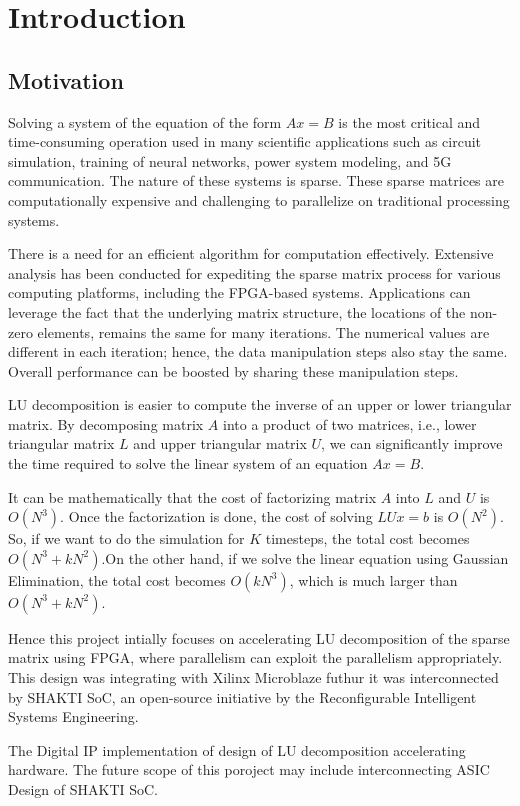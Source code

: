 \chapter{Introduction}
\section{Motivation}
Solving a system of the equation of the form $Ax=B$ is the most critical and time-consuming operation used in many scientific applications such as circuit simulation, training of neural networks, power system modeling, and 5G communication. The nature of these systems is sparse. These sparse matrices are computationally expensive and challenging to parallelize on traditional processing systems.

There is a need for an efficient algorithm for computation effectively.  Extensive analysis has been conducted for expediting the sparse matrix process for various computing platforms, including the FPGA-based systems. Applications can leverage the fact that the underlying matrix structure, the locations of the non-zero elements, remains the same for many iterations. The numerical values are different in each iteration; hence, the data manipulation steps also stay the same. Overall performance can be boosted by sharing these manipulation steps.

LU decomposition is easier to compute the inverse of an upper or lower triangular matrix. By decomposing matrix $A$ into a product of two matrices, i.e., lower triangular matrix $L$ and upper triangular matrix $U$, we can significantly improve the time required to solve the linear system of an equation $Ax = B$.

It can be mathematically that the cost of factorizing matrix $A$ into $L$ and $U$ is $O(N^3)$. Once the factorization is done, the cost of solving $LUx = b$ is $O(N^2)$. So, if we want to do the simulation for $K$ timesteps, the total cost becomes $O(N^3 + kN^2)$.On the other hand, if we solve the linear equation using Gaussian Elimination, the total cost becomes $O(kN^3)$, which is much larger than $O(N^3 + kN^2)$.

Hence this project intially focuses on accelerating LU decomposition of the sparse matrix using FPGA, where parallelism can exploit the parallelism appropriately. This design was integrating with Xilinx Microblaze futhur it was interconnected by SHAKTI SoC, an open-source initiative by the Reconfigurable Intelligent Systems Engineering.

The Digital IP implementation of design of LU decomposition accelerating hardware. The future scope of this poroject may include interconnecting ASIC Design of SHAKTI SoC.

